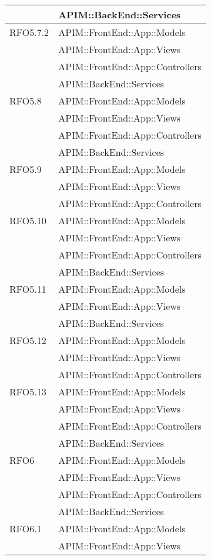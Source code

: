 \begin{longtable}{ p{4cm} | p{12cm} }
			& APIM::BackEnd::Services \\
			\hline		
			RFO5.7.2
			& APIM::FrontEnd::App::Models \\
			& APIM::FrontEnd::App::Views \\
			& APIM::FrontEnd::App::Controllers \\
			& APIM::BackEnd::Services \\
			\hline		
			RFO5.8
			& APIM::FrontEnd::App::Models \\
			& APIM::FrontEnd::App::Views \\
			& APIM::FrontEnd::App::Controllers \\
			& APIM::BackEnd::Services \\
			\hline		
			RFO5.9
			& APIM::FrontEnd::App::Models \\
			& APIM::FrontEnd::App::Views \\
			& APIM::FrontEnd::App::Controllers \\
			\hline		
			RFO5.10
			& APIM::FrontEnd::App::Models \\
			& APIM::FrontEnd::App::Views \\
			& APIM::FrontEnd::App::Controllers \\
			& APIM::BackEnd::Services \\
			\hline		
			RFO5.11
			& APIM::FrontEnd::App::Models \\
			& APIM::FrontEnd::App::Views \\
			& APIM::BackEnd::Services \\
			\hline		
			RFO5.12
			& APIM::FrontEnd::App::Models \\
			& APIM::FrontEnd::App::Views \\
			& APIM::FrontEnd::App::Controllers \\
			\hline		
			RFO5.13
			& APIM::FrontEnd::App::Models \\
			& APIM::FrontEnd::App::Views \\
			& APIM::FrontEnd::App::Controllers \\
			& APIM::BackEnd::Services \\
			\hline		
			RFO6
			& APIM::FrontEnd::App::Models \\
			& APIM::FrontEnd::App::Views \\
			& APIM::FrontEnd::App::Controllers \\
			& APIM::BackEnd::Services \\			
			\hline		
			RFO6.1
			& APIM::FrontEnd::App::Models \\
			& APIM::FrontEnd::App::Views \\

\end{longtable}
